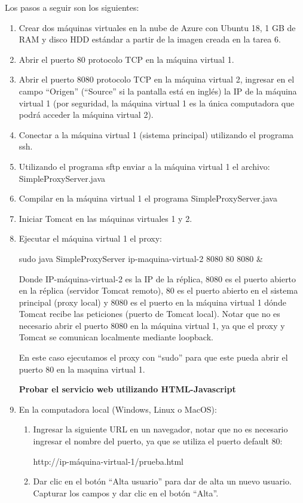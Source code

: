 \documentclass[11pt]{article}
\begin{document}
	Los pasos a seguir son los siguientes:
		\begin{enumerate}
			\item Crear dos máquinas virtuales en la nube de Azure con Ubuntu 18, 1 GB de RAM y disco HDD estándar a partir de la imagen creada en la tarea 6.
			\item Abrir el puerto 80 protocolo TCP en la máquina virtual 1.
			\item Abrir el puerto 8080 protocolo TCP en la máquina virtual 2, ingresar en el campo ``Origen'' (``Source'' si la pantalla está en inglés) la IP de la máquina virtual 1 (por seguridad, la máquina virtual 1 es la única computadora que podrá acceder la máquina virtual 2).
			\item Conectar a la máquina virtual 1 (sistema principal) utilizando el programa ssh.
			\item Utilizando el programa sftp enviar a la máquina virtual 1 el archivo: SimpleProxyServer.java
			\item Compilar en la máquina virtual 1 el programa SimpleProxyServer.java
			\item Iniciar Tomcat en las máquinas virtuales 1 y 2.
			\item Ejecutar el máquina virtual 1 el proxy:\par
			sudo java SimpleProxyServer ip-maquina-virtual-2 8080 80 8080 \&\par
			Donde IP-máquina-virtual-2 es la IP de la réplica, 8080 es el puerto abierto en la réplica (servidor Tomcat remoto), 80 es el puerto abierto en el sistema principal (proxy local) y 8080 es el puerto en la máquina virtual 1 dónde Tomcat recibe las peticiones (puerto de Tomcat local). Notar que no es necesario abrir el puerto 8080 en la máquina virtual 1, ya que el proxy y Tomcat se comunican localmente mediante loopback.\par
En este caso ejecutamos el proxy con ``sudo'' para que este pueda abrir el puerto 80 en la maquina virtual 1.\par
			\textbf{Probar el servicio web utilizando HTML-Javascript}
			\item En la computadora local (Windows, Linux o MacOS):
				\begin{enumerate}
				    \item Ingresar la siguiente URL en un navegador, notar que no es necesario ingresar el nombre del puerto, ya que se utiliza el puerto default 80:\par http://ip-máquina-virtual-1/prueba.html
 					\item Dar clic en el botón ``Alta usuario'' para dar de alta un nuevo usuario. Capturar los campos y dar clic en el botón ``Alta''.

\end{enumerate}
\end{enumerate}
\end{document}
